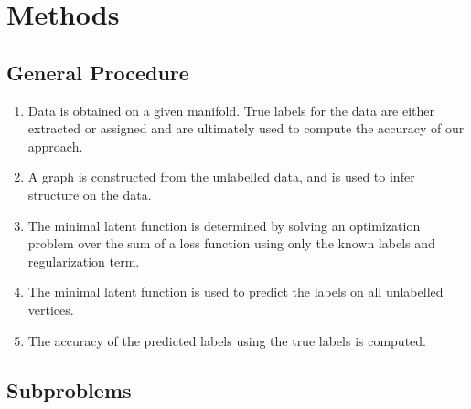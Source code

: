 \documentclass[12pt]{amsart}
\begin{document}

\section{Methods}

\subsection{General Procedure}
\begin{enumerate}
    \item Data is obtained on a given manifold. True labels for the data are either extracted or assigned and are ultimately used to compute the accuracy of our approach.
    \item A graph is constructed from the unlabelled data, and is used to infer structure on the data. 
    \item The minimal latent function is determined by solving an optimization problem over the sum of a loss function using only the known labels and regularization term.
    \item The minimal latent function is used to predict the labels on all unlabelled vertices.
    \item The accuracy of the predicted labels using the true labels is computed.
\end{enumerate}

\subsection{Subproblems}
\end{document}
